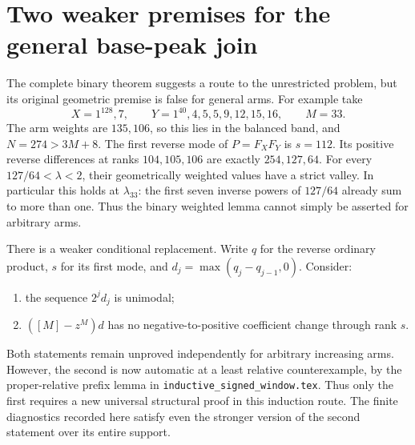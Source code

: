 \section{Two weaker premises for the general base-peak join}
The complete binary theorem suggests a route to the unrestricted
problem, but its original geometric premise is false for general arms.
For example take
\[
 X=1^{128},7,\qquad Y=1^{40},4,5,5,9,12,15,16,\qquad M=33.
\]
The arm weights are $135,106$, so this lies in the balanced band,
and $N=274>3M+8$. The first reverse mode of $P=F_XF_Y$ is
$s=112$. Its positive reverse differences at ranks $104,105,106$
are exactly $254,127,64$. For every $127/64<\lambda<2$, their
geometrically weighted values have a strict valley. In particular
this holds at $\lambda_{33}$: the first seven inverse powers of
$127/64$ already sum to more than one. Thus the binary weighted
lemma cannot simply be asserted for arbitrary arms.

There is a weaker conditional replacement. Write $q$ for the
reverse ordinary product, $s$ for its first mode, and
$d_j=\max(q_j-q_{j-1},0)$. Consider:
\begin{enumerate}
\item the sequence $2^jd_j$ is unimodal;
\item $([M]-z^M)d$ has no negative-to-positive coefficient change
through rank $s$.
\end{enumerate}
Both statements remain unproved independently for arbitrary increasing arms.
However, the second is now automatic at a least relative counterexample,
by the proper-relative prefix lemma in
\texttt{inductive\_signed\_window.tex}. Thus only the first requires
a new universal structural proof in this induction route.
The finite diagnostics recorded here satisfy even the stronger
version of the second statement over its entire support.

